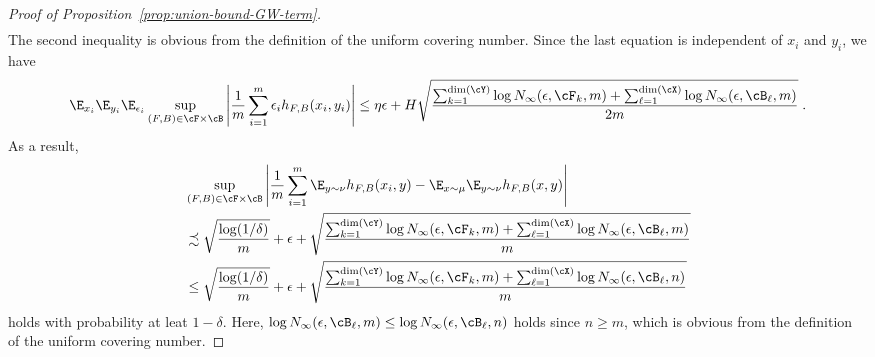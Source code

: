 \documentclass[11pt]{article}
\begin{document}
\begin{proof}[Proof of Proposition~\ref{prop:union-bound-GW-term}]
\begin{equation*}
\begin{split}
		\end{split}
	\end{equation*}
	The second inequality is obvious from the definition of the uniform covering number. Since the last equation is independent of $x_i$ and $y_i$, we have 
	\begin{equation*}
		\E_{x_i} \E_{y_i} \E_{\epsilon_i} \sup_{(F, B) \in \cF \times \cB} \left|\frac{1}{m} \sum_{i=1}^{m} \epsilon_i h_{F, B}(x_i, y_i) \right| 
		\le 
		\eta \epsilon +  H \sqrt{\frac{\sum_{k = 1}^{\mathrm{dim}(\cY)} \log N_{\infty}(\epsilon, \cF_k, m) + \sum_{\ell = 1}^{\mathrm{dim}(\cX)} \log N_{\infty}(\epsilon, \cB_\ell, m)}{2 m}} \;.
	\end{equation*}
	As a result,
	\begin{equation}
		\label{eqn:b1}
		\begin{split}
			& \sup_{(F, B) \in \cF \times \cB} \left|\frac{1}{m} \sum_{i=1}^{m} \E_{y \sim \nu} h_{F, B}(x_i, y) - \E_{x \sim \mu} \E_{y \sim \nu} h_{F, B}(x, y)\right| \\
			& \precsim
			\sqrt{\frac{\log(1 / \delta)}{m}} + \epsilon +  \sqrt{\frac{\sum_{k = 1}^{\mathrm{dim}(\cY)} \log N_{\infty}(\epsilon, \cF_k, m) + \sum_{\ell = 1}^{\mathrm{dim}(\cX)} \log N_{\infty}(\epsilon, \cB_\ell, m)}{m}} \\
			& \le
			\sqrt{\frac{\log(1 / \delta)}{m}} + \epsilon +  \sqrt{\frac{\sum_{k = 1}^{\mathrm{dim}(\cY)} \log N_{\infty}(\epsilon, \cF_k, m) + \sum_{\ell = 1}^{\mathrm{dim}(\cX)} \log N_{\infty}(\epsilon, \cB_\ell, n)}{m}}
		\end{split}
	\end{equation}
	holds with probability at leat $1 - \delta$. Here, $\log N_{\infty}(\epsilon, \cB_\ell, m) \le \log N_{\infty}(\epsilon, \cB_\ell, n)$ holds since $n \ge m$, which is obvious from the definition of the uniform covering number. 


\end{proof}
\end{document}
